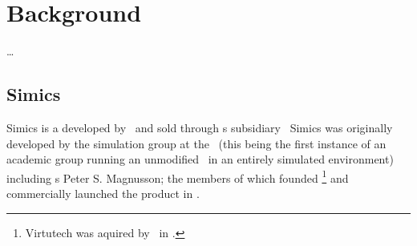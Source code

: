 
\chapter{Background}
\label{cha:background}
\ldots





\section*{Simics}
\label{sec:background_simics}
Simics is a  developed by \dvttermintel\ and sold through \dvttermintel s subsidiary \dvttermwindriver\
Simics was originally developed by the simulation group at the \dvttermsics\ (this being the first instance of an academic group running an unmodified \dvttermos\ in an entirely simulated environment) including \dvttermgoogle s Peter S. Magnusson; the members of which founded \dvttermvirtutech \footnote{Virtutech was aquired by \dvttermintel\ in .} and commercially launched the product in .\\

